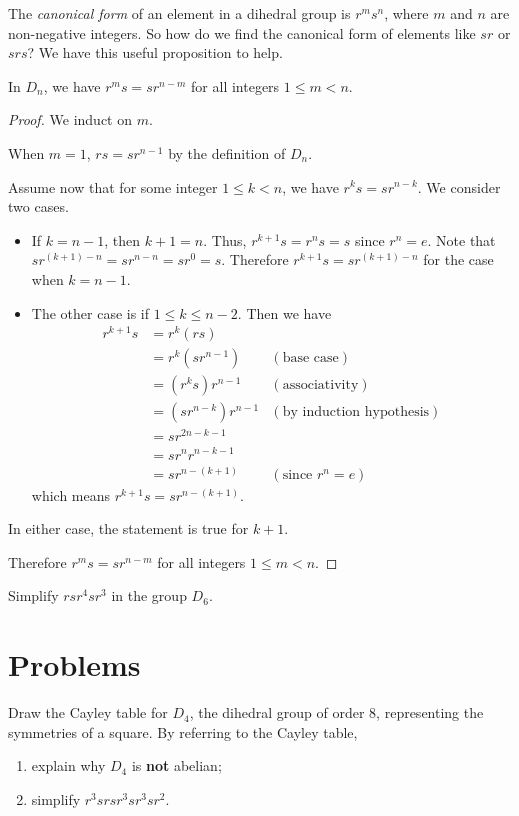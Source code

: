The \textit{canonical form} of an element in a dihedral group is $r^ms^n$, where $m$ and $n$ are non-negative integers. So how do we find the canonical form of elements like $sr$ or $srs$? We have this useful proposition to help.
\begin{proposition}
    In $D_n$, we have $r^ms = sr^{n-m}$ for all integers $1 \leq m < n$.
\end{proposition}
\begin{proof}
    We induct on $m$.
    
    When $m = 1$, $rs = sr^{n-1}$ by the definition of $D_n$.
    
    Assume now that for some integer $1 \leq k < n$, we have $r^ks = sr^{n-k}$. We consider two cases.
    \begin{itemize}
        \item If $k = n - 1$, then $k + 1 = n$. Thus, $r^{k+1}s = r^ns = s$ since $r^n = e$. Note that $sr^{(k+1)-n} = sr^{n-n} = sr^0 = s$. Therefore $r^{k+1}s = sr^{(k+1)-n}$ for the case when $k = n - 1$.
        \item The other case is if $1 \leq k \leq n - 2$. Then we have
        \begin{align*}
            r^{k+1}s &= r^k(rs)\\
            &= r^k(sr^{n-1}) & (\text{base case})\\
            &= (r^ks)r^{n-1} & (\text{associativity})\\
            &= (sr^{n-k})r^{n-1} & (\text{by induction hypothesis})\\
            &= sr^{2n - k - 1}\\
            &= sr^nr^{n-k-1}\\
            &= sr^{n-(k+1)} & (\text{since } r^n = e)
        \end{align*}
        which means $r^{k+1}s = sr^{n-(k+1)}$.
    \end{itemize}
    In either case, the statement is true for $k+1$.
    
    Therefore $r^ms = sr^{n-m}$ for all integers $1 \leq m < n$.
\end{proof}

\begin{exercise}
    Simplify $rsr^4sr^3$ in the group $D_6$.
\end{exercise}

\newpage

\section{Problems}
\begin{problem}
    Draw the Cayley table for $D_4$, the dihedral group of order 8, representing the symmetries of a square.\newline
    By referring to the Cayley table,
    \begin{enumerate}[label=(\alph*)]
        \item explain why $D_4$ is \textbf{not} abelian;
        \item simplify $r^3srsr^3sr^3sr^2$.
    \end{enumerate}
\end{problem}

